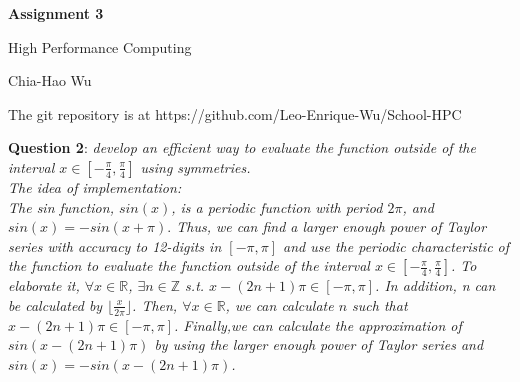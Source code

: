 \documentclass[12pt]{article} %
\newcommand{\question}[2][]{\begin{flushleft}
        \textbf{Question #1}: \textit{#2}

\end{flushleft}}
\newcommand{\maketitletwo}[2][]{\begin{center}
        \Large{\textbf{Assignment #1}
        
        High Performance Computing} %
        \vspace{5pt}
        
        \normalsize{Chia-Hao Wu  %
        
        #2}        %
        \vspace{15pt}
        
\end{center}}
\begin{document}
    \maketitletwo[3]{}  %
    
    \begin{flushleft}
    The git repository is at https://github.com/Leo-Enrique-Wu/School-HPC\vspace{15pt}
    \end{flushleft}
    
    \question[2]{
      develop an efficient way to evaluate the function outside of the interval $x \in [-\frac{\pi}{4}, \frac{\pi}{4}]$ using symmetries.\vspace{10pt}\\
      \normalsize{The idea of implementation:}\vspace{5pt}\\
      The sin function, $sin(x)$, is a periodic function with period $2\pi$, and $sin(x) = -sin(x + \pi).$ Thus, we can find a larger enough power of Taylor series with accuracy to 12-digits in $[-\pi, \pi]$ and use the periodic characteristic of the function to evaluate the function outside of the interval $x \in [-\frac{\pi}{4}, \frac{\pi}{4}]$. To elaborate it, $\forall x \in \mathbb{R}$, $\exists n \in \mathbb{Z}$ s.t. $x - (2n + 1)\pi \in [-\pi, \pi]$. In addition, n can be calculated by $\lfloor\frac{x}{2\pi}\rfloor$. Then, $\forall x \in \mathbb{R}$, we can calculate $n$ such that $x - (2n + 1)\pi \in [-\pi, \pi]$. Finally,we can calculate the approximation of $sin(x - (2n + 1)\pi)$ by using the larger enough power of Taylor series and  $sin(x) = -sin(x - (2n + 1)\pi)$.
    }
    
\end{document}
